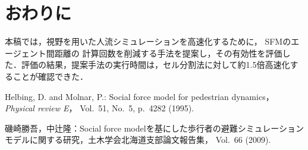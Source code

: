 \documentclass{maelab_y}
\begin{document}
\section{おわりに}
本稿では，視野を用いた人流シミュレーションを高速化するために，
SFMのエージェント間距離の
計算回数を削減する手法を提案し，その有効性を評価した．評価の結果，提案手法の実行時間は，セル分割法に対して約1.5倍高速化することが確認できた．

\begin{thebibliography}{9}
{\footnotesize

  Helbing, D. and Molnar, P.: Social force model for pedestrian dynamics，{\em
    Physical review E}， Vol.~51, No.~5, p.\ 4282 (1995).

  磯崎勝吾，中辻隆：Social force
  modelを基にした歩行者の避難シミュレーションモデルに関する研究，土木学会北海道支部論文報告集，
  Vol.~66 (2009).
}

\end{thebibliography}
\end{document}
